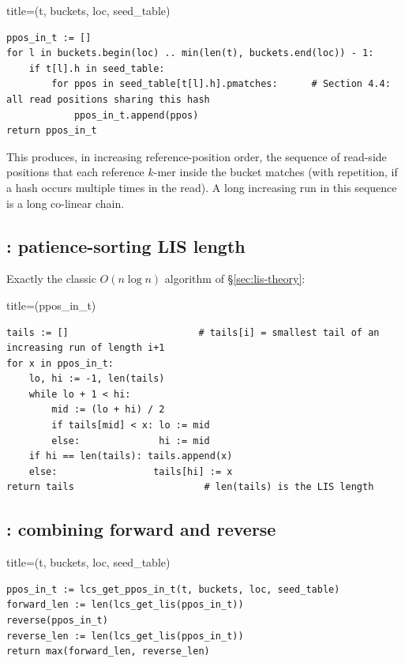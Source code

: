 \begin{algobox}{title={(t, buckets, loc, seed\_table)}}
\begin{verbatim}
ppos_in_t := []
for l in buckets.begin(loc) .. min(len(t), buckets.end(loc)) - 1:
    if t[l].h in seed_table:
        for ppos in seed_table[t[l].h].pmatches:      # Section 4.4: all read positions sharing this hash
            ppos_in_t.append(ppos)
return ppos_in_t
\end{verbatim}
\end{algobox}

This produces, in increasing reference-position order, the sequence of read-side positions that
each reference $k$-mer inside the bucket matches (with repetition, if a hash occurs multiple times
in the read). A long increasing run in this sequence is a long co-linear chain.

\subsection{: patience-sorting LIS length}
\label{sec:lcs-lis}

Exactly the classic $O(n\log n)$ algorithm of \S\ref{sec:lis-theory}:

\begin{algobox}{title={(ppos\_in\_t)}}
\begin{verbatim}
tails := []                       # tails[i] = smallest tail of an increasing run of length i+1
for x in ppos_in_t:
    lo, hi := -1, len(tails)
    while lo + 1 < hi:
        mid := (lo + hi) / 2
        if tails[mid] < x: lo := mid
        else:              hi := mid
    if hi == len(tails): tails.append(x)
    else:                 tails[hi] := x
return tails                       # len(tails) is the LIS length
\end{verbatim}
\end{algobox}

\subsection{: combining forward and reverse}

\begin{algobox}{title={(t, buckets, loc, seed\_table)}}
\begin{verbatim}
ppos_in_t := lcs_get_ppos_in_t(t, buckets, loc, seed_table)
forward_len := len(lcs_get_lis(ppos_in_t))
reverse(ppos_in_t)
reverse_len := len(lcs_get_lis(ppos_in_t))
return max(forward_len, reverse_len)
\end{verbatim}
\end{algobox}


